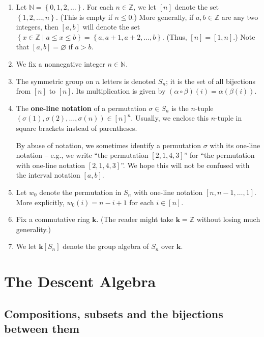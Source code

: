 \documentclass[12pt]{article}
\theoremstyle{definition}%
\theoremstyle{definition}%
\theoremstyle{remark}%
\newcommand{\tup}[1]{\left( #1 \right)}
\newcommand{\interval}[1]{\left[ #1 \right]} %
\newcommand{\ponl}[1]{\left[ #1 \right]} %
\newcommand{\set}[1]{\left\{ #1 \right\}}
\newcommand{\NN}{\mathbb{N}}
\newcommand{\ZZ}{\mathbb{Z}}
\newcommand{\kk}{\mathbf{k}}
\newcommand{\ksn}{\kk\left[S_n\right]}
\newcommand{\wo}{w_0} %
\newcommand{\defin}[1]{\textbf{#1}}
\begin{document}
\begin{enumerate}[]
    \item Let $\NN = \set{0,1,2,\ldots}$.
    For each $n \in \ZZ$, we let $\interval{n}$ denote the set $ \set{1,2,\dots,n} $. (This is empty if $n \leq 0$.)
	More generally, if $a, b \in \ZZ$ are any two integers, then $\interval{a, b}$ will denote the set $\set{x \in \ZZ \mid a \leq x \leq b} = \set{a,a+1,a+2,\ldots,b}$. (Thus, $\interval{n} = \interval{1, n}$.) Note that $\interval{a, b} = \varnothing$ if $a > b$.

    \item We fix a nonnegative integer $ n \in \NN $.

    \item The symmetric group on $ n $ letters is denoted $ S_n $; it is the set of all bijections from $\interval{n}$ to $\interval{n}$.
	Its multiplication is given by $\tup{\alpha \circ \beta}\tup{i} = \alpha\tup{\beta\tup{i}}$.

    \item The \defin{one-line notation} of a permutation $\sigma \in S_n$ is the $n$-tuple $\tup{\sigma\tup{1}, \sigma\tup{2}, \ldots, \sigma\tup{n}} \in \interval{n}^n$.
	Usually, we enclose this $n$-tuple in square brackets instead of parentheses.

	By abuse of notation, we sometimes identify a permutation $\sigma$ with its one-line notation -- e.g., we write ``the permutation $\ponl{2,1,4,3}$'' for ``the permutation with one-line notation $\ponl{2,1,4,3}$''.
	We hope this will not be confused with the interval notation $\interval{a, b}$.

	\item Let $\wo$ denote the permutation in $S_n$ with one-line notation $ \ponl{ n,n-1,\dots,1 } $. More explicitly, $\wo\tup{ i } = n-i+1$ for each $i \in \interval{n}$.

    \item Fix a commutative ring $\kk$. (The reader might take $\kk = \ZZ$ without losing much generality.)

    \item We let $ \ksn $ denote the group algebra of $ S_n $ over $\kk$.
\end{enumerate}

\section{\label{sec.desalg}The Descent Algebra}

\subsection{Compositions, subsets and the bijections between them}
\end{document}
